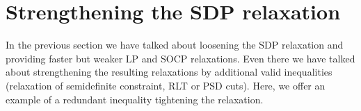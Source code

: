 \documentclass[12pt]{book}
\theoremstyle{definition}
\begin{document}
%	


\section{Strengthening the SDP relaxation}

In the previous section we have talked about loosening the SDP relaxation and providing faster but weaker LP and SOCP relaxations. Even there we have talked about strengthening the resulting relaxations by additional valid inequalities (relaxation of semidefinite constraint, RLT or PSD cuts). Here, we offer an example of a redundant inequality tightening the relaxation.
\end{document}

